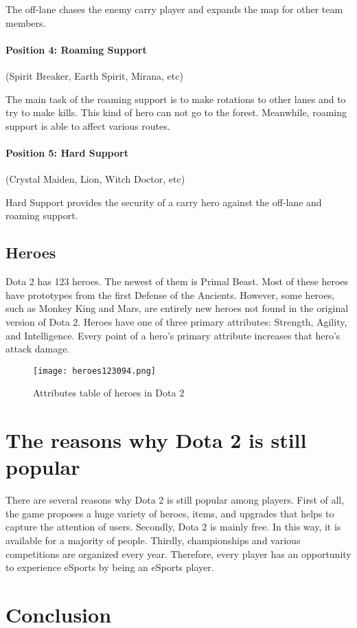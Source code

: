 \documentclass[12pt,twoside,english,a4paper]{article}
\begin{document}
The off-lane chases the enemy carry player and expands the map for other team members.
\paragraph{Position 4: Roaming Support}(Spirit Breaker, Earth Spirit, Mirana, etc)

The main task of the roaming support is to make rotations to other lanes and to try to make kills. This kind of hero can not go to the forest. Meanwhile, roaming support is able to affect various routes.
\paragraph{Position 5: Hard Support} (Crystal Maiden, Lion, Witch Doctor, etc)

Hard Support provides the security of a carry hero against the off-lane and roaming support.

\subsection{Heroes} \label{heroes}
Dota 2 has 123 heroes. The newest of them is Primal Beast. Most of these heroes have prototypes from the first Defense of the Ancients. However, some heroes, such as Monkey King and Mars, are entirely new heroes not found in the original version of Dota 2.
Heroes have one of three primary attributes: Strength, Agility, and Intelligence. Every point of a hero's primary attribute increases that hero's attack damage.
 \begin{figure}[H]
  \centering
  \caption{Attributes table of heroes in Dota 2\cite{Heroes:DOTA}}
  \texttt{[image: heroes123094.png]}
  \label{fig:heroes}
 \end{figure}  


\section{The reasons why Dota 2 is still popular} \label{the reasons why Dota 2 is still popular}
There are several reasons why Dota 2 is still popular among players. First of all, the game proposes a huge variety of heroes, items, and upgrades that helps to capture the attention of users. Secondly, Dota 2 is mainly free. In this way, it is available for a majority of people. Thirdly, championships and various competitions are organized every year. Therefore, every player has an opportunity to experience eSports by being an eSports player.\cite{Reasons:DOTA}

\section{Conclusion} \label{conclusion} %






\end{document}
